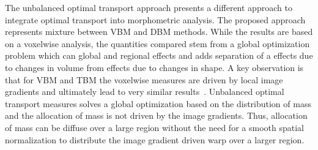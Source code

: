 \documentclass{llncs}
\begin{document}
The unbalanced optimal transport approach presents a different approach to
integrate optimal transport into morphometric analysis. The proposed approach
represents mixture between VBM and DBM methods.  While the results are based
on a voxelwise analysis, the quantities compared stem from a global
optimization problem which can global and regional effects and adds separation
of a effects due to changes in volume from effects due to changes in shape.  A
key observation is that for VBM and TBM the voxelwise measures are driven by
local image gradients and ultimately lead to very similar
results~\cite[Chaper~6]{frackowiak2004human}.  Unbalanced optimal transport
measures solves a global optimization based on the distribution of mass and the
allocation of mass is not driven by the image gradients. Thus, allocation of
mass can be diffuse over a large region without the need for a smooth spatial
normalization to distribute the image gradient driven warp over a larger
region.




\end{document}
